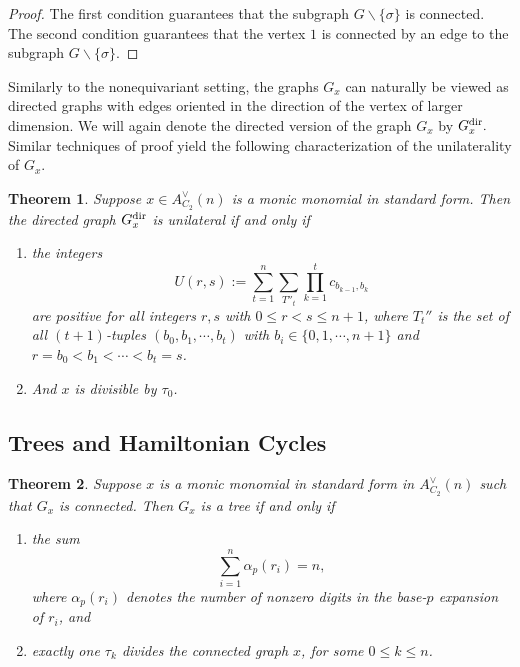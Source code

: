 \documentclass{amsart}
\newtheorem{theorem}{Theorem}[section]
\theoremstyle{definition}
\theoremstyle{plain}
\numberwithin{theorem}{section}
\numberwithin{equation}{section}
\numberwithin{figure}{section}
\newcommand{\0}{\langle 0 \rangle }
\begin{document}
\begin{proof}
    The first condition guarantees that the subgraph $G \backslash \{ \sigma \}$ is connected. The second condition guarantees that the vertex $1$ is connected by an edge to the subgraph $G \backslash \{ \sigma \}$.
\end{proof}

Similarly to the nonequivariant setting, the graphs $G_x$ can naturally be viewed as directed graphs with edges oriented in the direction of the vertex of larger dimension. We will again denote the directed version of the graph $G_x$ by $G^\textup{dir}_x.$ Similar techniques of proof yield the following characterization of the unilaterality of $G_x$.

\begin{theorem} \label{thm:unilateralC2}
     Suppose $x \in A_{C_2}^\vee(n)$ is a monic monomial { in standard form}. Then the directed graph $G_x^\textup{dir}$ is unilateral if and only if
    \begin{enumerate}
        \item the integers
        \[
        U(r,s) := \sum_{t=1}^{n}\sum_{{T}''_t}\prod_{k=1}^t c_{b_{k-1},b_k}
        \]
        are positive for all integers $r,s$ with $0 \leq r < s \leq n + 1$, where ${T}_t''$ is the set of all $(t + 1)$-tuples $(b_0, b_1, \cdots, b_t)$ with $b_i \in \{0, 1, \cdots, n + 1\}$ and $r = b_0 < b_1 < \cdots < b_t = s$.
        \item And $x$ is divisible by $\tau_0$.
    \end{enumerate}
\end{theorem}

\subsection{Trees and Hamiltonian Cycles}

\begin{theorem}
    Suppose $x$ is a monic monomial { in standard form} in $A_{C_2}^\vee(n)$ such that $G_x$ is connected. Then $G_x$ is a tree if and only if
   \begin{enumerate}
       \item the sum \[
            \sum_{i=1}^{n} \alpha_p(r_i) = n,
            \]
            where \( \alpha_p(r_i) \) denotes the number of nonzero digits in the base-\(p\) expansion of \( r_i \), and
            \item exactly one \( \tau_k \) divides the connected graph \( x \), for some \( 0 \leq k \leq n \).
   \end{enumerate}
\end{theorem}
\end{document}
